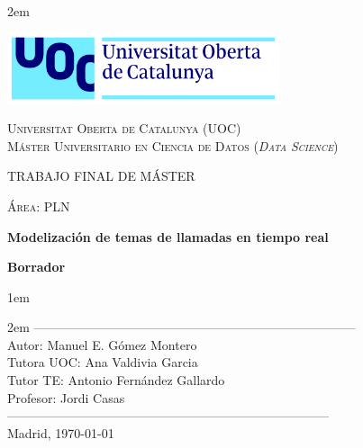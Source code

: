 \newpage
\thispagestyle{empty}

\baselineskip 2em


\centerline{\includegraphics[width=0.6\textwidth]{images/UOC-logo}}
\begin{center}
\textsc{Universitat Oberta de Catalunya (UOC) \\
 Máster Universitario en Ciencia de Datos (\textit{Data Science})\\}


\vspace*{1.5cm}

\textsc{\Large TRABAJO FINAL DE MÁSTER}

\vspace*{0.5cm}

\textsc{\large Área: PLN}



\vspace*{2.0cm}

\textbf{\Large Modelización de temas de llamadas en tiempo real}

\textbf{\large Borrador}

\vspace{2.5cm}
\baselineskip 1em

\baselineskip 2em
-----------------------------------------------------------------------------\\
Autor:      Manuel E. Gómez Montero\\
Tutora UOC:      Ana Valdivia Garcia\\
Tutor TE:      Antonio Fernández Gallardo\\
Profesor:   Jordi Casas\\
-----------------------------------------------------------------------------\\
\vspace*{1.5cm}
Madrid, \today

\end{center}

\newpage
\pagestyle{empty}
\hfill
